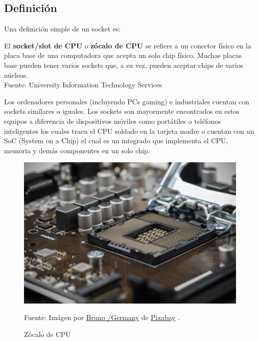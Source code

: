 \documentclass[conference]{IEEEtran}
\begin{document}
\subsection{Definición}

Una definición simple de un socket es:

\begin{displayquote}
    El \textbf{socket/slot de CPU} o \textbf{zócalo de CPU} se refiere a un conector físico en la placa base de una computadora que acepta un solo chip físico. Muchas placas base pueden tener varios sockets que, a su vez, pueden aceptar chips de varios núcleos.\\
    \small Fuente: University Information Technology Services \cite{university-information-technology-services-2019}
\end{displayquote}

Los ordenadores personales (incluyendo PCs gaming) e industriales cuentan con sockets similares o iguales. Los sockets son mayormente encontrados en estos equipos a diferencia de dispositivos móviles como portátiles o teléfonos inteligentes los cuales traen el CPU soldado en la tarjeta madre o cuentan con un SoC (System on a Chip) el cual es un integrado que implementa el CPU, memoria y demás componentes en un solo chip.

\begin{figure}[H]
    \centering
    \includegraphics[width=0.3\paperwidth]{images/cpu-socket.jpg}
    \caption{Zócalo de CPU} \footnotesize
    Fuente: Imágen por \href{https://pixabay.com/users/bru-no-1161770}{Bruno /Germany} de \href{https://pixabay.com}{Pixabay} \cite{pixabay-cpu-socket-2019}.
\end{figure}
\end{document}
